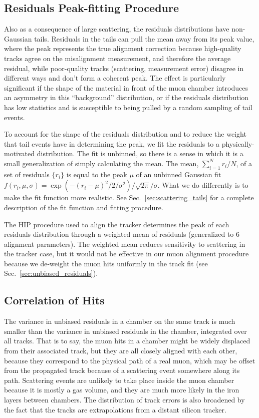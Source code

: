 \documentclass[12pt]{article}
\begin{document}
\subsection{Residuals Peak-fitting Procedure}
\label{sec:residuals_peak_fitting}

Also as a consequence of large scattering, the residuals distributions
have non-Gaussian tails.  Residuals in the tails can pull the mean
away from its peak value, where the peak represents the true alignment
correction because high-quality tracks agree on the misalignment
measurement, and therefore the average residual, while poor-quality
tracks (scattering, measurement error) disagree in different ways and
don't form a coherent peak.  The effect is particularly significant if
the shape of the material in front of the muon chamber introduces an
asymmetry in this ``background'' distribution, or if the residuals
distribution has low statistics and is susceptible to being pulled by
a random sampling of tail events.

To account for the shape of the residuals distribution and to reduce
the weight that tail events have in determining the peak, we fit the
residuals to a physically-motivated distribution.  The fit is
unbinned, so there is a sense in which it is a small generalization of
simply calculating the mean.  The mean, $\sum_{i=1}^N r_i / N$, of a
set of residuals $\{r_i\}$ is equal to the peak $\mu$ of an unbinned
Gaussian fit $f(r_i, \mu, \sigma) =
\exp(-(r_i-\mu)^2/2/\sigma^2)/\sqrt{2\pi}/\sigma$.  What we do
differently is to make the fit function more realistic.  See
Sec.~\ref{sec:scattering_tails} for a complete description of the fit
function and fitting procedure.

The HIP procedure used to align the tracker determines the peak of
each residuals distribution through a weighted mean of residuals
(generalized to 6 alignment parameters).  The weighted mean reduces
sensitivity to scattering in the tracker case, but it would not be
effective in our muon alignment procedure because we de-weight the
muon hits uniformly in the track fit (see
Sec.~\ref{sec:unbiased_residuals}).

\subsection{Correlation of Hits}
\label{sec:correlation_of_hits}

The variance in unbiased residuals in a chamber on the same track is
much smaller than the variance in unbiased residuals in the chamber,
integrated over all tracks.  That is to say, the muon hits in a
chamber might be widely displaced from their associated track, but
they are all closely aligned with each other, because they correspond
to the physical path of a real muon, which may be offset from the
propagated track because of a scattering event somewhere along its
path.  Scattering events are unlikely to take place inside the muon
chamber because it is mostly a gas volume, and they are much more
likely in the iron layers between chambers.  The distribution of track
errors is also broadened by the fact that the tracks are
extrapolations from a distant silicon tracker.
\end{document}
